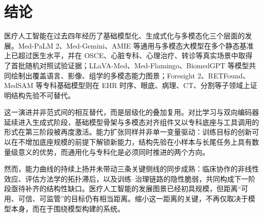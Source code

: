 \section{结论}

医疗人工智能在过去四年经历了基础模型化、生成式化与多模态化三个层面的发展。Med-PaLM 2、Med-Gemini、AMIE 等通用与多模态大模型在多个静态基准上已超过医生水平，并在 OSCE、心脏专科、心理治疗、转诊等真实场景中取得了首批随机对照试验证据；LLaVA-Med、Med-Flamingo、BiomedGPT 等模型共同绘制出覆盖语言、影像、组学的多模态能力图景；Foresight 2、RETFound、MedSAM 等专科基础模型则在 EHR 时序、眼底、病理、CT、分割等子领域上证明结构先验不可替代。

这一演进并非范式间的相互替代，而是层级化的叠加复用。对比学习与双向编码器延续进入生成式阶段，基础模型骨架与多模态对齐组件又以专科底座与工具调用的形式在第三阶段被再度激活。能力扩张同样并非单一变量驱动：训练目标的创新可以在不增加底座规模的前提下解锁新能力，结构先验在小样本与长尾任务上具有数量级意义的优势，而通用化与专科化是必须同时推进的两个方向。

然而，能力曲线的持续上扬并未带动三条关键侧线的同步成熟：临床协作的非线性效应、评估方法学的拓扑滞后，以及训练--治理链路的隐性脆弱，共同构成下一阶段亟待补齐的结构性缺口。医疗人工智能的发展图景已经初具规模，但距离“可用、可信、可监管”的目标仍有相当距离。缩小这一距离的关键，不再仅取决于模型本身，而在于围绕模型构建的系统。
